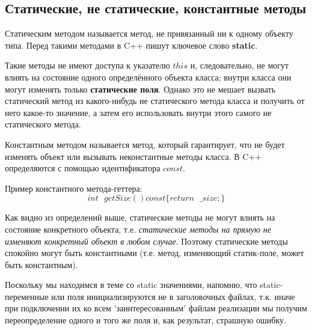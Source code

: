 \subsection{Статические, не статические, константные методы}
\begin{definition}
    Статическим методом называется метод, не привязанный ни к одному объекту типа. Перед такими методами в C++ пишут ключевое слово \textbf{static}.
\end{definition}
Такие методы не имеют доступа к указателю $this$ и, следовательно, не могут влиять на состояние одного определённого объекта класса; внутри класса они могут изменять только \textbf{статические поля}. Однако это не мешает вызвать статический метод из какого-нибудь не статического метода класса и получить от него какое-то значение, а затем его использовать внутри этого самого не статического метода.
\begin{definition}
    Константным методом называется метод, который гарантирует, что не будет изменять объект или вызывать неконстантные методы класса. В C++ определяются с помощью идентификатора $const$.
\end{definition}
Пример константного метода-геттера:
$$
    int\text{ }getSize()const\{return\text{ }\_size;\}
$$
\begin{observation}
Как видно из определений выше, статические методы не могут влиять на состояние конкретного объекта, т.е. \textit{статические методы на прямую не изменяют конкретный объект в любом случае}. Поэтому статические методы спокойно могут быть константными (т.е. метод, изменяющий статик-поле, может быть константным).
\end{observation}

\begin{notice}
    Поскольку мы находимся в теме со static значениями, напомню, что static-переменные или поля инициализируются не в заголовочных файлах, т.к. иначе при подключении их ко всем 'заинтересованным' файлам реализации мы получим переопределение одного и того же поля и, как результат, страшную ошибку.
\end{notice}

